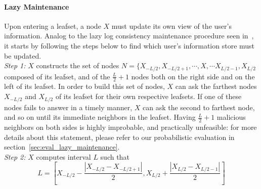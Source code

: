 \paragraph{Lazy Maintenance}




Upon entering a leafset, a node $X$ must update its own view of the user's
information. Analog to the lazy log consistency maintenance procedure seen
in~\cite{p2p_certification}, it starts by following the steps below to find
which user's information store must be updated.\\

\textit{Step 1:} $X$ constructs the set of nodes
$N = \{ X_{-L/2}, X_{-L/2 +1}, \cdots, X, \cdots X_{L/2 -1}, X_{L/2} $
composed of its leafset, and of the $\frac{L}{2} +1$ nodes both on the right
side and on the left of its leafset. 
In order to build this set of nodes, $X$ can ask the farthest nodes $X_{-L/2}$
and $X_{L/2}$ of its leafset for their own respective leafsets. If one of these
nodes fails to answer in a timely manner, $X$ can ask the second to farthest
node, and so on until its immediate neighbors in the leafset. Having
$\frac{L}{2} +1$ malicious neighbors on both sides is highly improbable, and
practically unfeasible: for more details about this statement, please refer to
our probabilistic evaluation in section~\eqref{sec:eval_lazy_maintenance}. \\

\textit{Step 2:} $X$ computes interval $L$ such that
$$
L = [ X_{-L/2} - \frac{| X_{-L/2} - X_{-L/2 +1} |}{2}, X_{L/2} +\frac{|
X_{L/2} - X_{L/2 -1} |}{2} ]
$$


